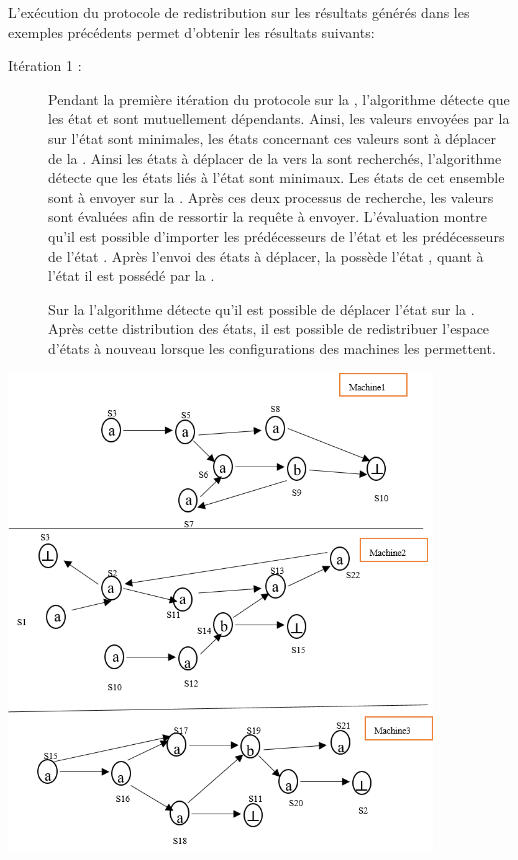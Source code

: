 \begin{Exemple}\label{ea5}
L'exécution du protocole de redistribution sur les résultats générés dans les exemples précédents permet d'obtenir  les résultats suivants:

\nopagebreak
\begin{description}
\item[Itération 1 :] Pendant la première itération du protocole sur la \mone{}, l'algorithme détecte que les état  et  sont mutuellement dépendants. Ainsi, les valeurs envoyées par la \mtwo{} sur l'état  sont minimales, les états concernant ces valeurs sont à déplacer de la \mtwo{}. Ainsi les états à déplacer de la \mone{} vers la \mtwo{} sont recherchés, l'algorithme détecte que les états liés à l'état  sont minimaux. Les états de cet ensemble sont à envoyer sur la \mtwo{}. Après ces deux processus de recherche, les valeurs sont évaluées afin de ressortir la requête à envoyer. L'évaluation montre qu'il est possible d'importer les prédécesseurs de l'état  et les prédécesseurs de  l'état .
 Après l'envoi des états à déplacer, la \mone{} possède l'état , quant à l'état  il est possédé par la \mtwo{}.
 
Sur la \mtree{} l'algorithme détecte qu'il est possible de déplacer l'état  sur la \mtwo{}.
   Après cette distribution des états, il est possible de redistribuer l'espace d'états à nouveau lorsque les configurations des machines les permettent.
   
\end{description}
\centering
	\includegraphics[height=5in]{img/skrd.png}
	
\end{Exemple}